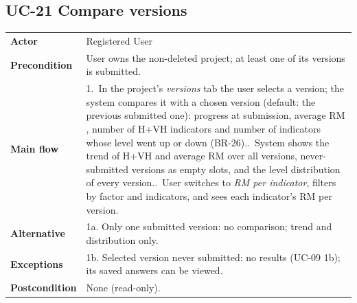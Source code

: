 \documentclass[11pt,a4paper]{article}
\newcommand{\RM}{\mathrm{RM}}
\begin{document}
\noindent\begin{minipage}{\linewidth}
\subsection*{UC-21 Compare versions}
\begin{tabularx}{\linewidth}{@{}>{\raggedright\leavevmode\bfseries\color{creBlue}}p{2.6cm} Y@{}}
\toprule
Actor & Registered User \\
Precondition & User owns the non-deleted project; at least one of its versions is submitted. \\
Main flow & 1.~In the project's \emph{versions} tab the user selects a version; the system compares it with a chosen version (default: the previous submitted one): progress at submission, average $\RM$, number of H+VH indicators and number of indicators whose level went up or down (BR-26)..~System shows the trend of H+VH and average $\RM$ over all versions, never-submitted versions as empty slots, and the level distribution of every version..~User switches to \emph{RM per indicator}, filters by factor and indicators, and sees each indicator's $\RM$ per version. \\
Alternative & 1a. Only one submitted version: no comparison; trend and distribution only. \\
Exceptions & 1b. Selected version never submitted: no results (UC-09 1b); its saved answers can be viewed. \\
Postcondition & None (read-only). \\
\bottomrule
\end{tabularx}
\end{minipage}
\par\medskip
\end{document}
